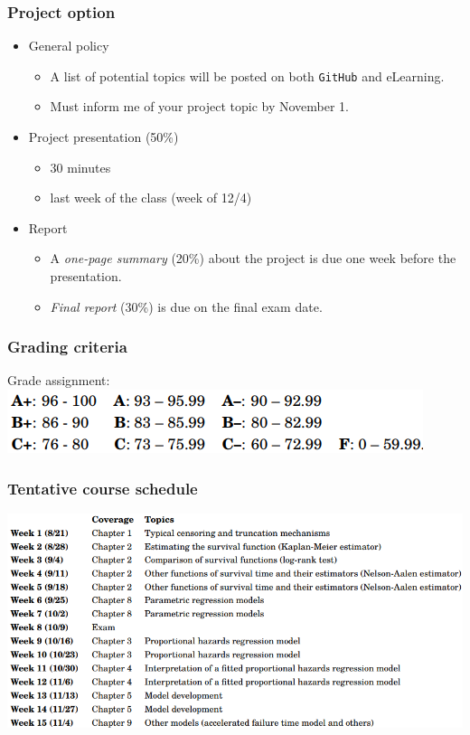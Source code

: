 \documentclass{beamer}
\begin{document}
\begin{frame}
\frametitle{Project option}
\begin{itemize}
\item General policy
\begin{itemize}
\item A list of potential topics will be posted on both \texttt{GitHub} and eLearning. 
\item Must inform me of your project topic by November 1. 
\end{itemize}
\item Project presentation (50\%)
\begin{itemize}
\item 30 minutes 
\item last week of the class (week of 12/4)
\end{itemize}
\item Report 
\begin{itemize}
\item A \emph{one-page summary} (20\%) about the project is due one week before the presentation.
\item \emph{Final report} (30\%) is due on the final exam date.
\end{itemize}
\end{itemize}
\end{frame}

\begin{frame}
\frametitle{Grading criteria}
Grade assignment:\\\vspace{.5cm}
\centering
\includegraphics[scale = .4]{grade}
\end{frame}

\begin{frame}
\frametitle{Tentative course schedule}
\centering\vspace{-.2cm}
\includegraphics[scale = .4]{schedule}
\end{frame}
\end{document}
